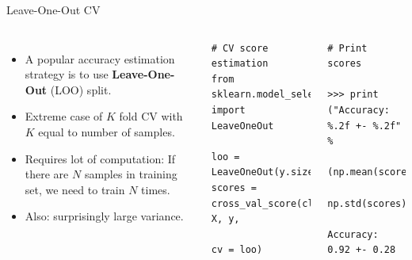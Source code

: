 \documentclass[10pt, aspectratio=169]{beamer} %
\begin{document}
\begin{frame}[fragile]{Leave-One-Out CV}
\begin{columns}
{\small\vspace*{-0.8cm}
\begin{itemize}
\item A popular accuracy estimation strategy is to use \textbf{Leave-One-Out} (LOO) split.
\item Extreme case of $K$ fold CV with $K$ equal to number of samples.
\item Requires lot of computation: If there are $N$ samples in training set, we need to 
train $N$ times.
\item Also: surprisingly large variance.
\end{itemize}
}
\begin{lstlisting}
# CV score estimation
from sklearn.model_selection import LeaveOneOut

loo = LeaveOneOut(y.size)
scores = cross_val_score(clf, X, y, 
                         cv = loo)

\end{lstlisting}
\begin{lstlisting}
# Print scores

>>> print ("Accuracy: %.2f +- %.2f" %
          (np.mean(scores), 
           np.std(scores)))

Accuracy: 0.92 +- 0.28
\end{lstlisting}
\end{columns}
\end{frame}
\end{document}

